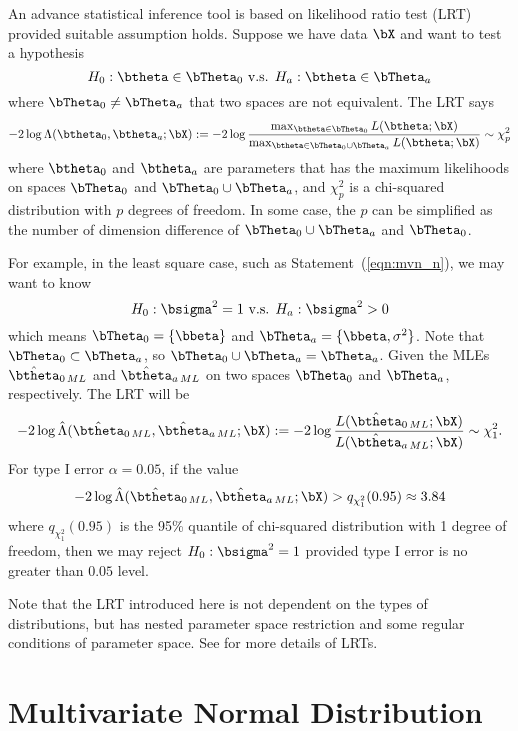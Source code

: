 An advance statistical inference tool is based on likelihood ratio test
(LRT) provided suitable assumption
holds. Suppose we have data $\bX$ and want to test a hypothesis
$$
  H_0: \btheta \in \bTheta_0 \mbox{ v.s. }
  H_a: \btheta \in \bTheta_a
$$
where $\bTheta_0 \neq \bTheta_a$ that two spaces are not equivalent.
The LRT says
\begin{equation}
-2\log \Lambda(\btheta_0, \btheta_a; \bX) :=
-2\log
\frac{
\max_{\btheta\in\bTheta_0} L(\btheta; \bX)
}{
\max_{\btheta\in\bTheta_0\cup\bTheta_a} L(\btheta; \bX)
}
\sim \chi^2_p
\label{eqn:LRT}
\end{equation}
where $\btheta_0$ and $\btheta_a$ are parameters that has the maximum
likelihoods on spaces $\bTheta_0$ and $\bTheta_0\cup\bTheta_a$, and
$\chi^2_p$ is a chi-squared distribution
with $p$ degrees of freedom. In some case, the $p$ can be simplified as
the number of dimension difference of $\bTheta_0\cup\bTheta_a$ and
$\bTheta_0$.

For example,
in the least square case, such as Statement~(\ref{eqn:mvn_n}),
we may want to know
$$
  H_0: \bsigma^2 = 1 \mbox{ v.s. }
  H_a: \bsigma^2 > 0 
$$
which means $\bTheta_0 = \{\bbeta\}$ and $\bTheta_a = \{\bbeta, \sigma^2\}$.
Note that $\bTheta_0 \subset \bTheta_a$, so
$\bTheta_0 \cup \bTheta_a = \bTheta_a$.
Given the MLEs $\hat{\btheta}_{0\,ML}$ and $\hat{\btheta}_{a\,ML}$
on two spaces $\bTheta_0$ and $\bTheta_a$, respectively.
The LRT will be
$$
  -2\log \hat{\Lambda}(\hat{\btheta}_{0\,ML}, \hat{\btheta}_{a\,ML}; \bX) :=
  -2\log
  \frac{
    L(\hat{\btheta}_{0\,ML}; \bX)
  }{
    L(\hat{\btheta}_{a\,ML}; \bX)
  }
  \sim \chi^2_1.
$$
For type I error $\alpha = 0.05$, if
the value
$$
  -2\log \hat{\Lambda}(\hat{\btheta}_{0\,ML}, \hat{\btheta}_{a\,ML}; \bX)
  > q_{\chi^2_1}(0.95) \approx 3.84
$$
where $q_{\chi^2_1}(0.95)$ is the 95\% quantile of chi-squared distribution
with 1 degree of freedom, then
we may reject $H_0: \bsigma^2 = 1$ provided type I error is no greater
than $0.05$ level.

Note that the LRT introduced here is not dependent on the types of
distributions, but has nested parameter space restriction and some
regular conditions of parameter space.
See \citet{Casella2001,Ferguson1996} for more details of LRTs.




\section{Multivariate Normal Distribution}
\label{sec:mvn}

